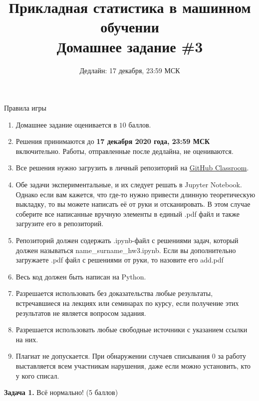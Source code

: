 \documentclass[10pt, a4paper]{extarticle}
\title{{\normalsize Прикладная статистика в машинном обучении} \\\vspace{0.5em} Домашнее задание \#3}
\author{Дедлайн: 17 декабря, 23:59 МСК}
\date{\rule{15cm}{0.4pt}}
\begin{document}
	
	\maketitle
	
	\begin{rulesbox}{Правила игры}
		\begin{enumerate}
			\item Домашнее задание оценивается в $10$ баллов.
			\item Решения принимаются до \textbf{17 декабря 2020 года, 23:59 МСК} включительно.
			Работы, отправленные после дедлайна, не оцениваются.
			\item Все решения нужно загрузить в личный репозиторий на \href{https://classroom.github.com/a/Eh3mAJ78}{GitHub Classroom}.
			\item Обе задачи экспериментальные, и их следует решать в Jupyter Notebook. Однако если вам кажется, что где-то нужно привести длинную теоретическую выкладку, то вы можете написать её от руки и отсканировать. В этом случае соберите все написанные вручную элементы в единый .pdf файл и также загрузите его в репозиторий. 
			\item Репозиторий должен содержать .ipynb-файл с решениями задач, который должен называться name\_surname\_hw3.ipynb. Если вы дополнительно загружаете .pdf файл с решениями от руки, то назовите его add.pdf
			 \item Весь код должен быть написан на Python.
			 \item Разрешается использовать без доказательства любые результаты, встречавшиеся на лекциях или семинарах по курсу, если получение этих результатов не является вопросом задания. 
			 \item Разрешается использовать любые свободные источники с указанием ссылки на них.
			 \item Плагиат не допускается.
			 При обнаружении случаев списывания $0$ за работу выставляется всем участникам нарушения, даже если можно установить, кто у кого списал. 
		\end{enumerate}
	\end{rulesbox}
	
	\newpage

	{\Large \textbf{Задача 1.} Всё нормально! (5 баллов)}
	
\end{document}
